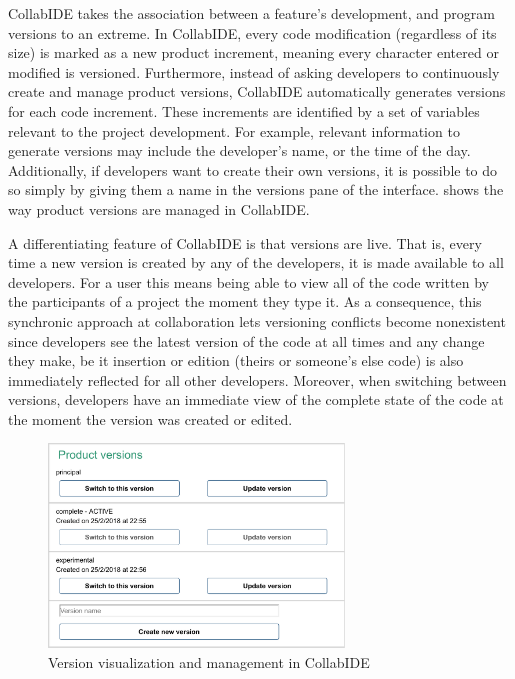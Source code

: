 CollabIDE takes the association between a feature's development, and program versions to an 
extreme. In CollabIDE, every code modification (regardless of its size) is marked as a new product 
increment, meaning every character entered or modified is versioned.
Furthermore, instead of asking developers to continuously create and manage product 
versions, CollabIDE automatically generates versions for each code increment. These increments are 
identified by a set of variables relevant to the project development. For example, relevant information 
to generate versions may include the developer's name, or the time of the day. Additionally, if 
developers want to create their own versions, it is possible to do so simply by giving them a name in 
the versions pane of the interface.  shows the way product versions are 
managed in CollabIDE. 

A differentiating feature of CollabIDE is that versions are live. That is, every time a new version is 
created by any of the developers, it is made available to all developers.  For a user this means being able to view
all of the code written by the participants of a project the moment they type it.
As a consequence, this synchronic approach at collaboration lets versioning conflicts become nonexistent since developers see the latest 
version of the code at all times and any change they make, be it insertion or edition (theirs or someone's else code)
 is also immediately reflected for all other developers. 
Moreover, when switching between versions, developers have an 
immediate view of the complete state of the code at the moment the version was created or edited. 

\begin{figure}[tbp]
  \centering
  \includegraphics[width=0.7\textwidth]{img/fig4-collabIDEVersionManagement}
  \caption{Version visualization and management in CollabIDE}
  \label{fig:versions}
\end{figure}

